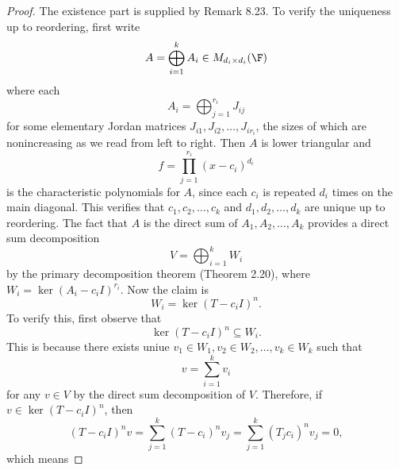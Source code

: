 \documentclass[linearalgebra]{subfiles}
\begin{document}
    \begin{proof}
        The existence part is supplied by Remark 8.23. To verify the uniqueness up to reordering, first write
        \begin{equation*}
            A = \bigoplus^{k}_{i=1} A_i\in M_{d_i\times d_i}(\F) 
        \end{equation*}
        where each
        \begin{equation*}
            A_i = \bigoplus^{r_i}_{j=1} J_{ij}
        \end{equation*}
        for some elementary Jordan matrices $J_{i 1}, J_{i 2}, \ldots, J_{ir_i}$, the sizes of which are nonincreasing as we read from left to right. Then $A$ is lower triangular and
        \begin{equation*}
            f = \prod^{r_i}_{j=1} \left( x-c_i \right) ^{d_i}
        \end{equation*}
        is the characteristic polynomials for $A$, since each $c_i$ is repeated $d_i$ times on the main diagonal. This verifies that $c_1,c_2,\ldots,c_k$ and $d_1,d_2,\ldots,d_k$ are unique up to reordering. The fact that $A$ is the direct sum of $A_1,A_2,\ldots,A_k$ provides a direct sum decomposition
        \begin{equation*}
            V = \bigoplus^{k}_{i=1} W_i
        \end{equation*}
        by the primary decomposition theorem (Theorem 2.20), where $W_i = \ker\left( A_i-c_iI \right) ^{r_i}$. Now the claim is
        \begin{equation*}
            W_i = \ker\left( T-c_iI \right) ^n.
        \end{equation*}
        To verify this, first observe that
        \begin{equation*}
            \ker\left( T-c_iI \right) ^n \subseteq W_i.
        \end{equation*}
        This is because there exists uniue $v_1\in W_1, v_2\in W_2,\ldots, v_k\in W_k$ such that
        \begin{equation*}
            v = \sum^{k}_{i=1} v_i
        \end{equation*}
        for any $v\in V$ by the direct sum decomposition of $V$. Therefore, if $v\in\ker\left( T-c_iI \right) ^n$, then
        \begin{equation*}
            \left( T-c_iI \right) ^nv = \sum^{k}_{j=1} \left( T-c_i \right)^nv_j = \sum^{k}_{j=1} \left( T_jc_i \right)^n v_j = 0, 
        \end{equation*}
        which means

\end{proof}
\end{document}
